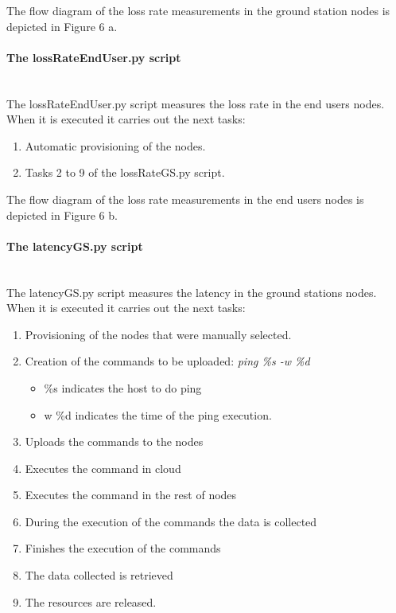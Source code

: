 The flow diagram of the loss rate measurements in the ground station nodes is
depicted in Figure 6 a.

\paragraph{The lossRateEndUser.py script}~\\

The lossRateEndUser.py  script measures the loss rate in the end users
nodes. When it is executed it carries out the next tasks:
\begin{enumerate}
\item Automatic provisioning of the nodes.
\item Tasks 2 to 9 of the lossRateGS.py script.
\end{enumerate}
The flow diagram of the loss rate measurements in the end users nodes is
depicted in Figure 6 b.

\paragraph{The latencyGS.py script}~\\

The latencyGS.py  script measures the latency  in the ground stations
nodes. When it is executed it carries out the next tasks:
\begin{enumerate}

\item Provisioning of the nodes that were manually selected.
\item Creation of the commands to be uploaded:
\emph{ping \%s -w \%d}
\begin{itemize}
\item \%s indicates the host to do ping
\item w \%d indicates the time of the ping execution. 
\end{itemize}
\item Uploads the commands to the nodes
\item Executes the command in cloud
\item Executes the command in the rest of nodes
\item During the execution of the commands the data is collected
\item Finishes the execution of the commands 
\item The data collected is retrieved 
\item The resources are released.
\end{enumerate}

